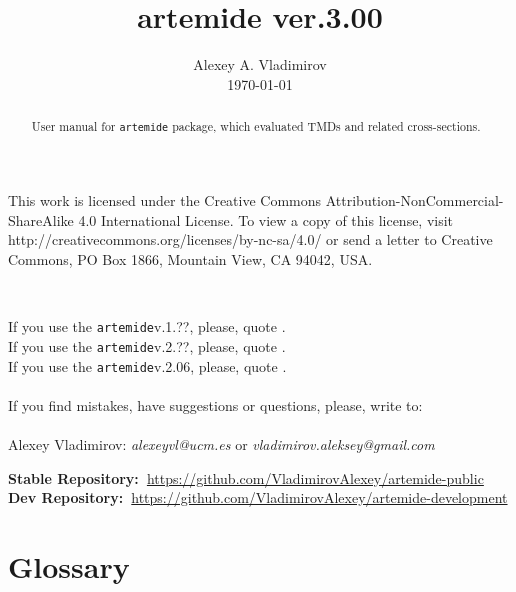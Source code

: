\documentclass[prd,nofootinbib,eqsecnum,final]{revtex4}
\renewcommand{\(}{\left(}
\renewcommand{\)}{\right)}
\renewcommand{\[}{\left[}
\renewcommand{\]}{\right]}
\newcommand{\red}[1]{{\color[rgb]{1,0,0} #1}}
\newcommand{\blue}[1]{{\color{blue} #1}}
\begin{document}
\title{artemide ver.3.00}
\author{Alexey A. Vladimirov \\ \today}
\noaffiliation
\begin{abstract}
User manual for \texttt{artemide} package, which evaluated TMDs and related cross-sections.
\center{\red{\textbf{Manual is updating.}}}
\end{abstract}
\maketitle

\begin{tcolorbox}
\begin{center}
This work is licensed under the Creative Commons Attribution-NonCommercial-ShareAlike 4.0 International License. To view a copy of this license, visit http://creativecommons.org/licenses/by-nc-sa/4.0/ or send a letter to Creative Commons, PO Box 1866, Mountain View, CA 94042, USA.

~

If you use the \texttt{artemide}v.1.??, please, quote \cite{Scimemi:2017etj}.
\\
If you use the \texttt{artemide}v.2.??, please, quote \cite{Scimemi:2019cmh}.
\\
If you use the \texttt{artemide}v.2.06, please, quote \cite{Moos:2023yfa}.
\\
~
\\
If you find mistakes, have suggestions or questions, please, write to: 
\\
~
\\
Alexey Vladimirov: \textit{alexeyvl@ucm.es} or \textit{vladimirov.aleksey@gmail.com}
\end{center}
\end{tcolorbox}

\begin{center}
\textbf{\blue{Stable Repository:~}}\href{https://github.com/VladimirovAlexey/artemide-public}{https://github.com/VladimirovAlexey/artemide-public}
\\
\textbf{\blue{Dev Repository:~}}\href{https://github.com/VladimirovAlexey/artemide-development}{https://github.com/VladimirovAlexey/artemide-development}
\end{center}


\tableofcontents

\renewcommand{\arraystretch}{1.5}


\newpage
\section*{Glossary}
\end{document}
